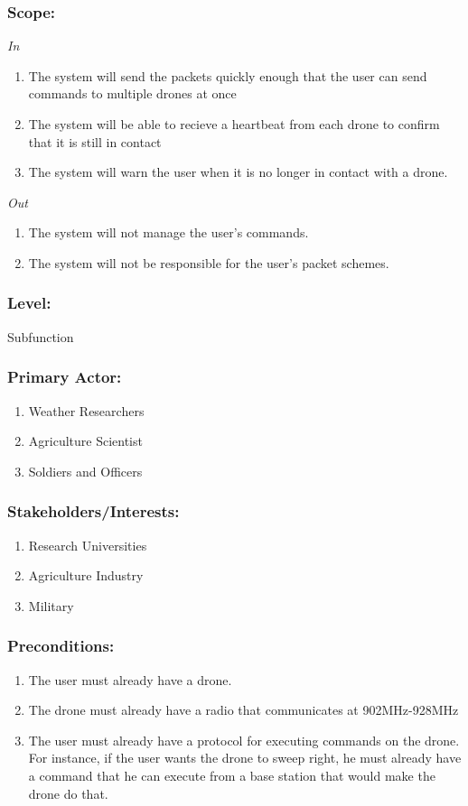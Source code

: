 \documentclass[ProductRequirements.tex]{subfiles}
\begin{document}
	\subsubsection*{Scope:}
	\textit{In}
	\begin{enumerate}
		\item The system will send the packets quickly enough that the user can send commands to multiple drones at once
		\item The system will be able to recieve a heartbeat from each drone to confirm that it is still in contact
		\item The system will warn the user when it is no longer in contact with a drone.
	\end{enumerate}
	\textit{Out}
	\begin{enumerate}
		\item The system will not manage the user's commands.
		\item The system will not be responsible for the user's packet schemes.
	\end{enumerate}
	\subsubsection*{Level:}
	Subfunction
	\subsubsection*{Primary Actor:}
	\begin{enumerate}
		\item Weather Researchers
		\item Agriculture Scientist
		\item Soldiers and Officers
	\end{enumerate}
	\subsubsection*{Stakeholders/Interests:}
	\begin{enumerate}\itemsep1pt
		\item Research Universities
		\item Agriculture Industry
		\item Military
	\end{enumerate}
	\subsubsection*{Preconditions:}
	\begin{enumerate}\itemsep1pt
		\item The user must already have a drone.
		\item The drone must already have a radio that communicates at 902MHz-928MHz
		\item The user must already have a protocol for executing commands on the drone. For instance, if the user wants the drone to sweep right, he must already have a command that he can execute from a base station that would make the drone do that.
	\end{enumerate}
\end{document}
